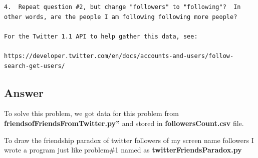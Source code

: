 \documentclass[letterpaper,11pt]{article}
\begin{document}
\begin{verbatim}
4.  Repeat question #2, but change "followers" to "following"?  In
other words, are the people I am following following more people?

For the Twitter 1.1 API to help gather this data, see:

https://developer.twitter.com/en/docs/accounts-and-users/follow-search-get-users/
\end{verbatim}

\clearpage
\subsection*{Answer}

To solve this problem, we got data for this problem from \textbf{friendsofFriendsFromTwitter.py”} and stored in \textbf{followersCount.csv} file.

To draw the friendship paradox of twitter followers of my screen name followers I wrote a program just like problem\#1 named as \textbf{twitterFriendsParadox.py}
\end{document}
